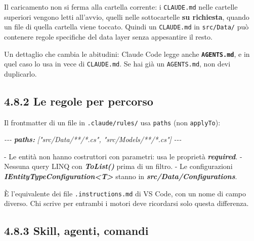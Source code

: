 \documentclass[
  italian,
  10pt,
]{book}
\newenvironment{Shaded}{\begin{snugshade}}{\end{snugshade}}
\newcommand{\AnnotationTok}[1]{\textcolor[rgb]{0.56,0.35,0.01}{\textbf{\textit{#1}}}}
\newcommand{\CommentTok}[1]{\textcolor[rgb]{0.56,0.35,0.01}{\textit{#1}}}
\newcommand{\InformationTok}[1]{\textcolor[rgb]{0.56,0.35,0.01}{\textbf{\textit{#1}}}}
\newcommand{\NormalTok}[1]{#1}
\newcommand{\SpecialStringTok}[1]{\textcolor[rgb]{0.31,0.60,0.02}{#1}}
\begin{document}
\normalsize

Il caricamento non si ferma alla cartella corrente: i \texttt{CLAUDE.md}
nelle cartelle superiori vengono letti all'avvio, quelli nelle
sottocartelle \textbf{su richiesta}, quando un file di quella cartella
viene toccato. Quindi un \texttt{CLAUDE.md} in \texttt{src/Data/} può
contenere regole specifiche del data layer senza appesantire il resto.

Un dettaglio che cambia le abitudini: Claude Code legge anche
\textbf{\texttt{AGENTS.md}}, e in quel caso lo usa in vece di
\texttt{CLAUDE.md}. Se hai già un \texttt{AGENTS.md}, non devi
duplicarlo.

\subsection{4.8.2 Le regole per percorso}\label{le-regole-per-percorso}

Il frontmatter di un file in \texttt{.claude/rules/} usa \texttt{paths}
(non \texttt{applyTo}):

\begin{Shaded}
\begin{Highlighting}[]
\CommentTok{{-}{-}{-}}
\AnnotationTok{paths:}\CommentTok{ ["src/Data/**/*.cs", "src/Models/**/*.cs"]}
\CommentTok{{-}{-}{-}}

\SpecialStringTok{{-} }\NormalTok{Le entità non hanno costruttori con parametri: usa le proprietà }\InformationTok{\textasciigrave{}required\textasciigrave{}}\NormalTok{.}
\SpecialStringTok{{-} }\NormalTok{Nessuna query LINQ con }\InformationTok{\textasciigrave{}ToList()\textasciigrave{}}\NormalTok{ prima di un filtro.}
\SpecialStringTok{{-} }\NormalTok{Le configurazioni }\InformationTok{\textasciigrave{}IEntityTypeConfiguration\textless{}T\textgreater{}\textasciigrave{}}\NormalTok{ stanno in }\InformationTok{\textasciigrave{}src/Data/Configurations\textasciigrave{}}\NormalTok{.}
\end{Highlighting}
\end{Shaded}

È l'equivalente dei file \texttt{.instructions.md} di VS Code, con un
nome di campo diverso. Chi scrive per entrambi i motori deve ricordarsi
solo questa differenza.

\subsection{4.8.3 Skill, agenti, comandi}\label{skill-agenti-comandi}

\footnotesize
\end{document}
